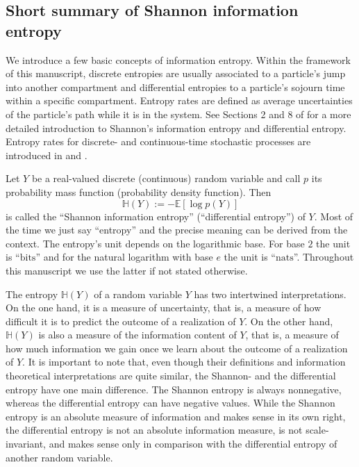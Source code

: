 \documentclass[smallextended]{svjour3}
\newcommand{\E}{\mathbb{E}}
\renewcommand{\H}{\mathbb{H}}
\newcommand{\bits}{\mathrm{bits}}
\newcommand{\nats}{\mathrm{nats}}
\newcommand{\ie}{that is}
\newcommand{\pdf}{probability density function}
\renewcommand{\emph}[1]{``#1''}
\begin{document}
\subsection{Short summary of Shannon information entropy}
\label{sec:entropy_basics}

We introduce a few basic concepts of information entropy.
Within the framework of this manuscript, discrete entropies are usually associated to a particle's jump into another compartment and differential entropies to a particle's sojourn time within a specific compartment.
Entropy rates are defined as average uncertainties of the particle's path while it is in the system.
See Sections 2 and 8 of \citet{Cover2006} for a more detailed introduction to Shannon's information entropy and differential entropy.
Entropy rates for discrete- and continuous-time stochastic processes are introduced in \citet[Section 4][]{Cover2006} and \citet{Dumitrescu1988MICAS}. 

Let $Y$ be a real-valued discrete (continuous) random variable and call $p$ its probability mass function (\pdf).
Then
\begin{equation}
  \label{eqn:entropy}
  \H(Y) := -\E\left[\log p(Y)\right]
\end{equation}
is called the \emph{Shannon information entropy} (\emph{differential entropy}) of $Y$.
Most of the time we just say \emph{entropy} and the precise meaning can be derived from the context.
The entropy's unit depends on the logarithmic base.
For base $2$ the unit is \emph{$\bits$} and for the natural logarithm with base $e$ the unit is \emph{$\nats$}.
Throughout this manuscript we use the latter if not stated otherwise.

The entropy $\H(Y)$ of a random variable $Y$ has two intertwined interpretations.
On the one hand, it is a measure of uncertainty, \ie, a measure of how difficult it is to predict the outcome of a realization of $Y$.
On the other hand, $\H(Y)$ is also a measure of the information content of $Y$, \ie, a measure of how much information we gain once we learn about the outcome of a realization of $Y$.
It is important to note that, even though their definitions and information theoretical interpretations are quite similar, the Shannon- and the differential entropy have one main difference.
The Shannon entropy is always nonnegative, whereas the differential entropy can have negative values.
While the Shannon entropy is an absolute measure of information and makes sense in its own right, the differential entropy is not an absolute information measure, is not scale-invariant, and makes sense only in comparison with the differential entropy of another random variable.
\end{document}
